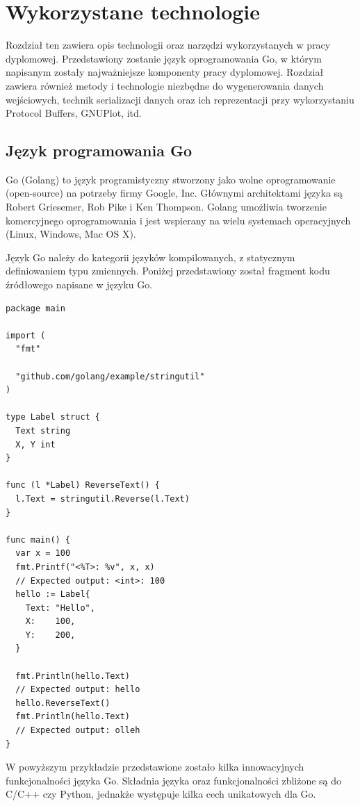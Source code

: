 \documentclass[a4paper,12pt,twoside,openany]{report}
\begin{document}
\chapter{Wykorzystane technologie}

Rozdział ten zawiera opis technologii oraz narzędzi wykorzystanych w pracy dyplomowej. 
Przedstawiony zostanie język oprogramowania Go, w którym napisanym zostały najważniejsze komponenty pracy dyplomowej. Rozdział zawiera również
metody i technologie niezbędne do wygenerowania danych wejściowych, technik serializacji danych oraz ich reprezentacji przy wykorzystaniu
Protocol Buffers, GNUPlot, itd.

\section{Język programowania Go}
Go (Golang) to język programistyczny stworzony jako wolne oprogramowanie (open-source) na potrzeby firmy Google, Inc. 
Głównymi architektami języka są Robert Griesemer, Rob Pike i Ken Thompson.
Golang umożliwia tworzenie komercyjnego oprogramowania i jest wspierany na wielu systemach operacyjnych (Linux, Windows, Mac OS X).

Język Go należy do kategorii języków kompilowanych, z statycznym definiowaniem typu zmiennych. 
Poniżej przedstawiony został fragment kodu źródłowego napisane w języku Go.

\begin{lstlisting}
package main

import (
  "fmt"

  "github.com/golang/example/stringutil"
)

type Label struct {
  Text string
  X, Y int
}

func (l *Label) ReverseText() {
  l.Text = stringutil.Reverse(l.Text)
}

func main() {
  var x = 100
  fmt.Printf("<%T>: %v", x, x)
  // Expected output: <int>: 100
  hello := Label{
    Text: "Hello",
    X:    100,
    Y:    200,
  }
  
  fmt.Println(hello.Text)
  // Expected output: hello
  hello.ReverseText()
  fmt.Println(hello.Text)
  // Expected output: olleh
}

\end{lstlisting}

W powyższym przykładzie przedstawione zostało kilka innowacyjnych funkcjonalności języka Go.
Składnia języka oraz funkcjonalności zbliżone są do C/C++ czy Python, jednakże występuje kilka cech unikatowych dla Go.
\end{document}
